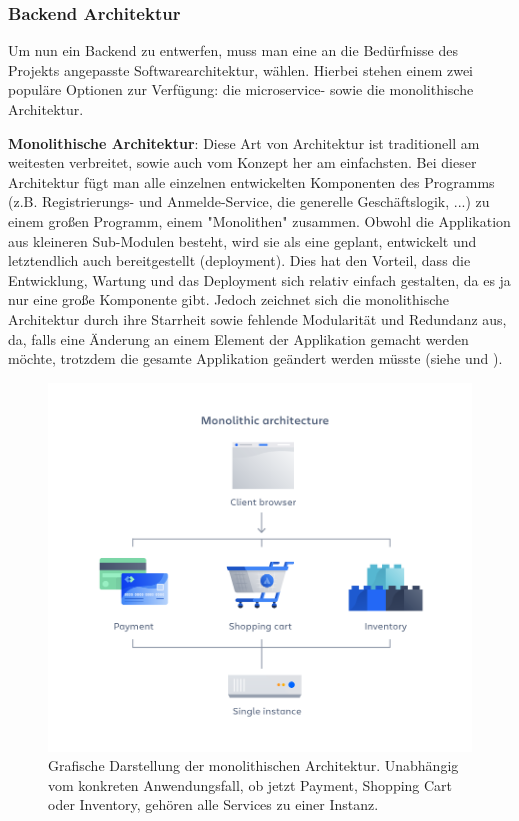 \subsubsection{Backend Architektur}

Um nun ein Backend zu entwerfen, muss man eine an die Bedürfnisse des Projekts angepasste Softwarearchitektur, wählen. Hierbei stehen einem zwei populäre Optionen zur Verfügung: die microservice- sowie die monolithische Architektur.

\textbf{Monolithische Architektur}: Diese Art von Architektur ist traditionell am weitesten verbreitet, sowie auch vom Konzept her am einfachsten. Bei dieser Architektur fügt man alle einzelnen entwickelten Komponenten des Programms (z.B. Registrierungs- und Anmelde-Service, die generelle Geschäftslogik, ...) zu einem großen Programm, einem "Monolithen" zusammen. 
Obwohl die Applikation aus kleineren Sub-Modulen besteht, wird sie als eine geplant, entwickelt und letztendlich auch bereitgestellt (\gls{deployment}). Dies hat den Vorteil, dass die Entwicklung, Wartung und das Deployment sich relativ einfach gestalten, da es ja nur eine große Komponente gibt. Jedoch zeichnet sich die monolithische Architektur durch ihre Starrheit sowie fehlende Modularität und Redundanz aus, da, falls eine Änderung an einem Element der Applikation gemacht werden möchte, trotzdem die gesamte Applikation geändert werden müsste (siehe \cite{website-atlassian-microservice-vs-monolothic} und \cite{paper-microservice-vs-monolithic}).

\begin{figure}
  \centering
    \includegraphics[width=1.0\textwidth]{images/monolithic-architecture-atlassian.png}
   \caption{Grafische Darstellung der monolithischen Architektur. 
   Unabhängig vom konkreten Anwendungsfall, ob jetzt Payment, Shopping Cart oder Inventory, gehören alle Services zu einer Instanz. \cite{website-atlassian-microservice-vs-monolothic}}
   \label{monolithic-arch-atlassian}
\end{figure}

